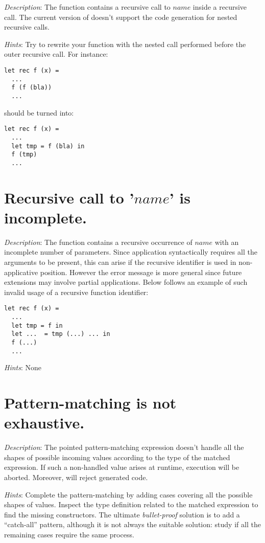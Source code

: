 {\em Description}: The function contains a recursive call to $name$
inside a recursive call. The current version of {\focal} doesn't
support the {\coq} code generation for nested recursive calls.

{\em Hints}: Try to rewrite your function with the nested call
performed before the outer recursive call. For instance:
{\scriptsize
\begin{lstlisting}
let rec f (x) =
  ...
  f (f (bla))
  ...
\end{lstlisting}
}
should be turned into:
{\scriptsize
\begin{lstlisting}
let rec f (x) =
  ...
  let tmp = f (bla) in
  f (tmp)
  ...
\end{lstlisting}
}



\section*{Recursive call to '$name$' is incomplete.}

{\em Description}: The function contains a recursive occurrence of
$name$ with an incomplete number of parameters. Since application
syntactically requires all the arguments to be present, this can arise
if the recursive identifier is used in non-applicative
position. However the error message is more general since future
extensions may involve partial applications. Below follows an example
of such invalid usage of a recursive function identifier:
{\scriptsize
\begin{lstlisting}
let rec f (x) =
  ...
  let tmp = f in
  let ...  = tmp (...) ... in
  f (...)
  ...
\end{lstlisting}
}

{\em Hints}: None


\section*{Pattern-matching is not exhaustive.}

{\em Description}: The pointed pattern-matching expression doesn't
handle all the shapes of possible incoming values according to the
type of the matched expression. If such a non-handled value arises at
runtime, execution will be aborted. Moreover, {\coq} will reject
generated code.

{\em Hints}: Complete the pattern-matching by adding cases covering
all the possible shapes of values. Inspect the type definition related
to the matched expression to find the missing constructors. The
ultimate {\em bullet-proof} solution is to add a ``catch-all''
pattern, although it is not always the suitable solution: study if all
the remaining cases require the same process.


